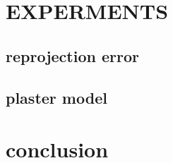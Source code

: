 \documentclass{article}
\begin{document}
\section{EXPERMENTS}

\subsection{reprojection error}

\subsection{plaster model}

\section{conclusion}




\end{document}
